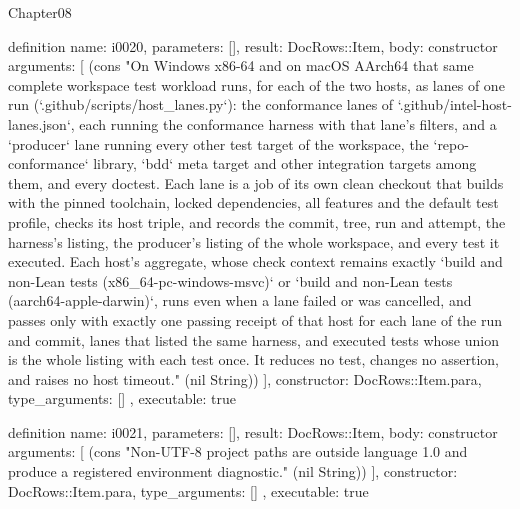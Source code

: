 \begin{lexlean}{Chapter08}
\begin{semanticmodule}
definition{
  name: i0020,
  parameters: [],
  result: DocRows::Item,
  body: constructor{
    arguments: [
      (cons "On Windows x86-64 and on macOS AArch64 that same complete workspace test workload runs, for each of the two hosts, as lanes of one run (`.github/scripts/host_lanes.py`): the conformance lanes of `.github/intel-host-lanes.json`, each running the conformance harness with that lane's filters, and a `producer` lane running every other test target of the workspace, the `repo-conformance` library, `bdd` meta target and other integration targets among them, and every doctest. Each lane is a job of its own clean checkout that builds with the pinned toolchain, locked dependencies, all features and the default test profile, checks its host triple, and records the commit, tree, run and attempt, the harness's listing, the producer's listing of the whole workspace, and every test it executed. Each host's aggregate, whose check context remains exactly `build and non-Lean tests (x86_64-pc-windows-msvc)` or `build and non-Lean tests (aarch64-apple-darwin)`, runs even when a lane failed or was cancelled, and passes only with exactly one passing receipt of that host for each lane of the run and commit, lanes that listed the same harness, and executed tests whose union is the whole listing with each test once. It reduces no test, changes no assertion, and raises no host timeout." (nil String))
    ],
    constructor: DocRows::Item.para,
    type_arguments: []
  },
  executable: true
}

definition{
  name: i0021,
  parameters: [],
  result: DocRows::Item,
  body: constructor{
    arguments: [
      (cons "Non-UTF-8 project paths are outside language 1.0 and produce a registered environment diagnostic." (nil String))
    ],
    constructor: DocRows::Item.para,
    type_arguments: []
  },
  executable: true
}


\end{semanticmodule}
\end{lexlean}
